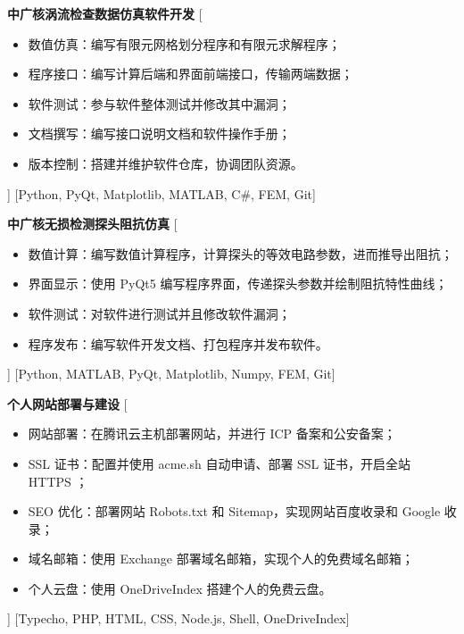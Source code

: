 \documentclass[zh]{resume}
\begin{document}
\begin{experiences}
    {\textbf{中广核涡流检查数据仿真软件开发}}%
    [%
        \begin{itemize}
            \item {数值仿真：编写有限元网格划分程序和有限元求解程序；}
            \item {程序接口：编写计算后端和界面前端接口，传输两端数据；}
            \item {软件测试：参与软件整体测试并修改其中漏洞；}
            \item {文档撰写：编写接口说明文档和软件操作手册；}
            \item {版本控制：搭建并维护软件仓库，协调团队资源。}
        \end{itemize}]
    [Python, PyQt, Matplotlib, MATLAB, C\#, FEM, Git]
    \separator{0.5ex}

    {\textbf{中广核无损检测探头阻抗仿真}}%
    [%
        \begin{itemize}
            \item {数值计算：编写数值计算程序，计算探头的等效电路参数，进而推导出阻抗；}
            \item {界面显示：使用 PyQt5 编写程序界面，传递探头参数并绘制阻抗特性曲线；}
            \item {软件测试：对软件进行测试并且修改软件漏洞；}
            \item {程序发布：编写软件开发文档、打包程序并发布软件。}
        \end{itemize}]
    [Python, MATLAB, PyQt, Matplotlib, Numpy, FEM, Git]
    \separator{0.5ex}

    {\textbf{个人网站部署与建设}}%
    [%
        \begin{itemize}
            \item {网站部署：在腾讯云主机部署网站，并进行 ICP 备案和公安备案；}
            \item {SSL 证书：配置并使用 acme.sh 自动申请、部署 SSL 证书，开启全站 HTTPS ；}
            \item {SEO 优化：部署网站 Robots.txt 和 Sitemap，实现网站百度收录和 Google 收录；}
            \item {域名邮箱：使用 Exchange 部署域名邮箱，实现个人的免费域名邮箱；}
            \item {个人云盘：使用 OneDriveIndex 搭建个人的免费云盘。}
        \end{itemize}]
    [Typecho, PHP, HTML, CSS, Node.js, Shell, OneDriveIndex]
    \separator{0.5ex}


\end{experiences}
\end{document}

